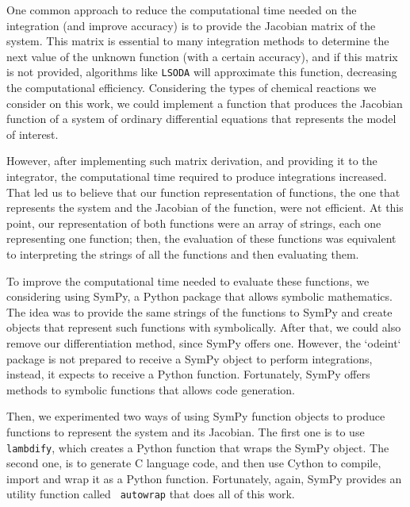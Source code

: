 

One common approach to reduce the computational time needed on the
integration (and improve accuracy) is to provide the Jacobian matrix of
the system. This matrix is essential to many integration methods to
determine the next value of the unknown function (with a certain
accuracy), and if this matrix is not provided, algorithms like 
{\tt LSODA} will approximate this function, decreasing the computational 
efficiency. Considering the types of chemical reactions we consider on
this work, we could implement a function that produces the Jacobian
function of a system of ordinary differential equations that represents
the model of interest.

However, after implementing such matrix derivation, and providing it to
the integrator, the computational time required to produce integrations
increased. That led us to believe that our function representation of
functions, the one that represents the system and the Jacobian of the
function, were not efficient. At this point, our representation of both
functions were an array of strings, each one representing one function;
then, the evaluation of these functions was equivalent to interpreting
the strings of all the functions and then evaluating them.

To improve the computational time needed to evaluate these functions, we
considering using SymPy, a Python package that allows symbolic
mathematics. The idea was to provide the same strings of the functions
to SymPy and create objects that represent such functions with
symbolically. After that, we could also remove our differentiation
method, since SymPy offers one. However, the `odeint` package is not
prepared to receive a SymPy object to perform integrations, instead, it
expects to receive a Python function. Fortunately, SymPy offers methods
to symbolic functions that allows code generation.

Then, we experimented two ways of using SymPy function objects to 
produce functions to represent the system and its Jacobian. The first
one is to use {\tt lambdify}, which creates a Python function that wraps the
SymPy object. The second one, is to generate C language code, and then 
use Cython to compile, import and wrap it as a Python function.
Fortunately, again, SymPy provides an utility function called {\tt 
autowrap} that does all of this work.

